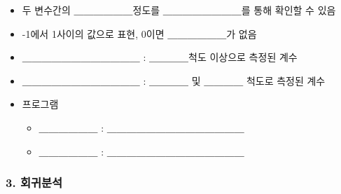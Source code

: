 \documentclass[11pt]{article}
\providecommand{\tightlist}{%
      \setlength{\itemsep}{0pt}\setlength{\parskip}{0pt}}
\begin{document}
\begin{enumerate}
  \begin{itemize}
  \tightlist
  \item
    두 변수간의 ＿＿＿＿＿＿정도를 ＿＿＿＿＿＿＿＿를 통해 확인할 수
    있음
  \item
    -1에서 1사이의 값으로 표현, 0이면 ＿＿＿＿＿＿가 없음
  \item
    ＿＿＿＿＿＿＿＿＿＿＿＿ : ＿＿＿＿척도 이상으로 측정된 계수
  \item
    ＿＿＿＿＿＿＿＿＿＿＿＿ : ＿＿＿＿ 및 ＿＿＿＿ 척도로 측정된 계수
  \item
    프로그램

    \begin{itemize}
    \tightlist
    \item
      ＿＿＿＿＿＿ : ＿＿＿＿＿＿＿＿＿＿＿＿＿＿
    \item
      ＿＿＿＿＿＿ : ＿＿＿＿＿＿＿＿＿＿＿＿＿＿
    \end{itemize}
  \end{itemize}
\end{enumerate}

    \hypertarget{uxd68cuxadc0uxbd84uxc11d}{%
\subsubsection{3. 회귀분석}\label{uxd68cuxadc0uxbd84uxc11d}}
\end{document}
